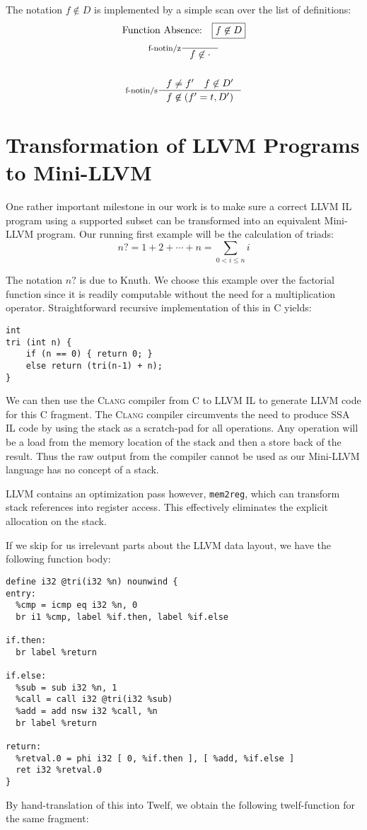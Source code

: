 \documentclass[a4paper, oneside, 10pt, draft]{memoir}
\newcommand{\clang}{\textsc{Clang}}
\begin{document}
The notation $f \not \in D$ is implemented by a simple scan over the
list of definitions:
\begin{gather*}
  \text{Function Absence:} \quad \boxed{f \not \in D}\\
  \inference[f-notin/z]{}{f \not \in \cdot}\\\\
  \inference[f-notin/s]{f \neq f' \quad f \not \in D'}{f \not \in (f' = t, D')}
\end{gather*}
\section{Transformation of LLVM Programs to Mini-LLVM}

One rather important milestone in our work is to make sure a correct
LLVM IL program using a supported subset can be transformed into an
equivalent Mini-LLVM program. Our running first example will be the
calculation of triads:
\begin{equation}
  \label{eq:1}
  n? = 1 + 2 + \dotsb + n = \sum_{0 < i \leq n} i
\end{equation}

The notation $n?$ is due to Knuth\cite[section
1.2.5]{knuth:1997:taocp1}. We choose this example over the factorial
function since it is readily computable without the need for a
multiplication operator. Straightforward recursive implementation of
this in C yields:
\begin{verbatim}
int
tri (int n) {
    if (n == 0) { return 0; }
    else return (tri(n-1) + n);
}
\end{verbatim}
We can then use the \clang{} compiler from C to LLVM IL to generate
LLVM code for this C fragment. The \clang{} compiler circumvents the
need to produce SSA IL code by using the stack as a scratch-pad for
all operations. Any operation will be a load from the memory location
of the stack and then a store back of the result. Thus the raw output
from the compiler cannot be used as our Mini-LLVM language has no
concept of a stack.

LLVM contains an optimization pass however, \texttt{mem2reg}, which
can transform stack references into register access. This effectively
eliminates the explicit allocation on the stack.

If we skip for us irrelevant parts about the LLVM data layout, we have
the following function body:
\begin{verbatim}
define i32 @tri(i32 %n) nounwind {
entry:
  %cmp = icmp eq i32 %n, 0
  br i1 %cmp, label %if.then, label %if.else

if.then:
  br label %return

if.else:
  %sub = sub i32 %n, 1
  %call = call i32 @tri(i32 %sub)
  %add = add nsw i32 %call, %n
  br label %return

return:
  %retval.0 = phi i32 [ 0, %if.then ], [ %add, %if.else ]
  ret i32 %retval.0
}
\end{verbatim}
By hand-translation of this into Twelf, we obtain the following
twelf-function for the same fragment:
\end{document}
